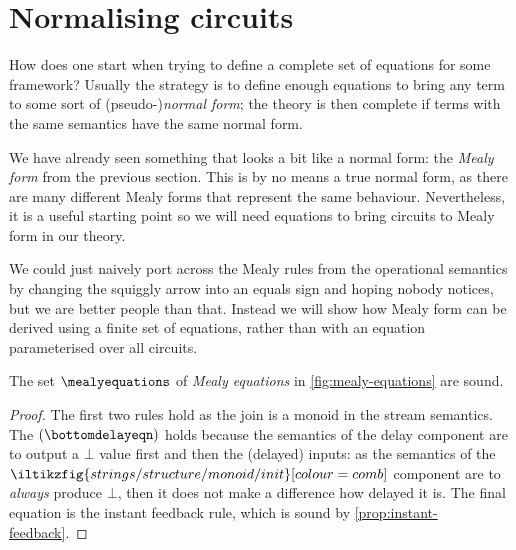 \section{Normalising circuits}

How does one start when trying to define a complete set of equations for some
framework?
Usually the strategy is to define enough equations to bring any term to some
sort of (pseudo-)\emph{normal form}; the theory is then complete if terms with
the same semantics have the same normal form.

We have already seen something that looks a bit like a normal form: the
\emph{Mealy form} from the previous section.
This is by no means a true normal form, as there are many different Mealy forms
that represent the same behaviour.
Nevertheless, it is a useful starting point so we will need equations to bring
circuits to Mealy form in our theory.

We could just naively port across the Mealy rules from the operational semantics
by changing the squiggly arrow into an equals sign and hoping nobody notices,
but we are better people than that.
Instead we will show how Mealy form can be derived using a finite set of
equations, rather than with an equation parameterised over all circuits.



\begin{definition}
    The set \(\mealyequations\) of \emph{Mealy equations} in
    \cref{fig:mealy-equations} are sound.
\end{definition}
\begin{proof}
    The first two rules hold as the join is a monoid in the stream semantics.
    The \((\bottomdelayeqn)\) holds because the semantics of the delay
    component are to output a \(\bot\) value first and then the (delayed)
    inputs: as the semantics of the \(
    \iltikzfig{strings/structure/monoid/init}[colour=comb]
    \) component are to \emph{always} produce \(\bot\), then it does not make a
    difference how delayed it is.
    The final equation is the instant feedback rule, which is sound by
    \cref{prop:instant-feedback}.
\end{proof}

